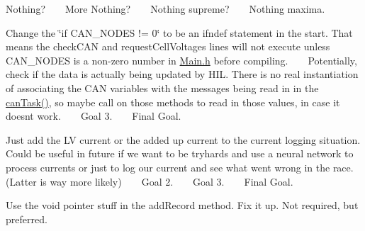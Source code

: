 
\begin{DoxyRefList}
\item[File \mbox{\hyperlink{_c_a_n_8h}{CAN.h}} ]\label{todo__todo000001}%
%
 Nothing? ~\newline
 ~\newline
 More Nothing? ~\newline
 ~\newline
 Nothing supreme? ~\newline
 ~\newline
 Nothing maxima.  
\item[File \mbox{\hyperlink{_c_a_n_8ino}{CAN.ino}} ]\label{todo__todo000002}%
%
 Change the \char`\"{}if CAN\+\_\+\+NODES != 0\char`\"{} to be an ifndef statement in the start. That means the check\+CAN and request\+Cell\+Voltages lines will not execute unless CAN\+\_\+\+NODES is a non-\/zero number in \mbox{\hyperlink{_main_8h}{Main.\+h}} before compiling. ~\newline
 ~\newline
 Potentially, check if the data is actually being updated by HIL. There is no real instantiation of associating the CAN variables with the messages being read in in the \mbox{\hyperlink{_c_a_n_8h_a785e095da30ce4993a186804102bf2ea}{can\+Task()}}, so maybe call on those methods to read in those values, in case it doesnt work. ~\newline
 ~\newline
 Goal 3. ~\newline
 ~\newline
 Final Goal.  
\item[File \mbox{\hyperlink{_data_logging_8h}{Data\+Logging.h}} ]\label{todo__todo000003}%
%
 Just add the LV current or the added up current to the current logging situation. Could be useful in future if we want to be tryhards and use a neural network to process currents or just to log our current and see what went wrong in the race. (Latter is way more likely) ~\newline
 ~\newline
 Goal 2. ~\newline
 ~\newline
 Goal 3. ~\newline
 ~\newline
 Final Goal.  
\item[File \mbox{\hyperlink{_data_logging_8ino}{Data\+Logging.ino}} ]\label{todo__todo000004}%
%
 Use the void pointer stuff in the add\+Record method. Fix it up. Not required, but preferred. ~\newline

\end{DoxyRefList}
